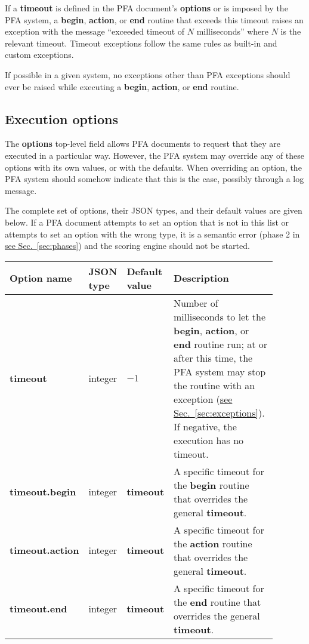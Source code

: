 \documentclass{article}
\newcommand{\PFAc}{\ttfamily\bfseries}
\theoremstyle{definition}
\begin{document}
If a {\PFAc timeout} is defined in the PFA document's {\PFAc options} or is imposed by the PFA system, a {\PFAc begin}, {\PFAc action}, or {\PFAc end} routine that exceeds this timeout raises an exception with the message ``exceeded timeout of $N$ milliseconds'' where $N$ is the relevant timeout.  Timeout exceptions follow the same rules as built-in and custom exceptions.

If possible in a given system, no exceptions other than PFA exceptions should ever be raised while executing a {\PFAc begin}, {\PFAc action}, or {\PFAc end} routine.

\hypertarget{hsec:options}{}
\subsection{Execution options}
\label{sec:options}

The {\PFAc options} top-level field allows PFA documents to request that they are executed in a particular way.  However, the PFA system may override any of these options with its own values, or with the defaults.  When overriding an option, the PFA system should somehow indicate that this is the case, possibly through a log message.

The complete set of options, their JSON types, and their default values are given below.  If a PFA document attempts to set an option that is not in this list or attempts to set an option with the wrong type, it is a semantic error (phase 2 in \hyperlink{hsec:phases}{see Sec.~\ref{sec:phases}}) and the scoring engine should not be started.

\noindent\begin{longtable}{p{0.23\linewidth} p{0.12\linewidth} p{0.14\linewidth} p{0.4\linewidth}}
{\bf Option name} & {\bf JSON type} & {\bf Default value} & {\bf Description} \\\hline\endhead
{\PFAc timeout} & integer & $-1$ & Number of milliseconds to let the {\PFAc begin}, {\PFAc action}, or {\PFAc end} routine run; at or after this time, the PFA system may stop the routine with an exception (\hyperlink{hsec:exceptions}{see Sec.~\ref{sec:exceptions}}).  If negative, the execution has no timeout. \\
{\PFAc timeout.begin} & integer & {\PFAc timeout} & A specific timeout for the {\PFAc begin} routine that overrides the general {\PFAc timeout}. \\
{\PFAc timeout.action} & integer & {\PFAc timeout} & A specific timeout for the {\PFAc action} routine that overrides the general {\PFAc timeout}. \\
{\PFAc timeout.end} & integer & {\PFAc timeout} & A specific timeout for the {\PFAc end} routine that overrides the general {\PFAc timeout}. \\
\end{longtable}
\end{document}
